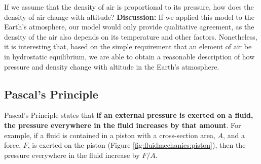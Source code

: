 \begin{example}{If we assume that the density of air is proportional to its pressure, how does the density of air change with altitude?}
\textbf{Discussion:} If we applied this model to the Earth's atmosphere, our model would only provide qualitative agreement, as the density of the air also depends on its temperature and other factors. Nonetheless, it is interesting that, based on the simple requirement that an element of air be in hydrostatic equilibrium, we are able to obtain a reasonable description of how pressure and density change with altitude in the Earth's atmosphere.
\end{example}

\subsection{Pascal's Principle}
Pascal's Principle states that \textbf{if an external pressure is exerted on a fluid, the pressure everywhere in the fluid increases by that amount}. For example, if a fluid is contained in a piston with a cross-section area, $A$, and a force, $F$, is exerted on the piston (Figure \ref{fig:fluidmechanics:piston}), then the pressure everywhere in the fluid increase by $F/A$. 

